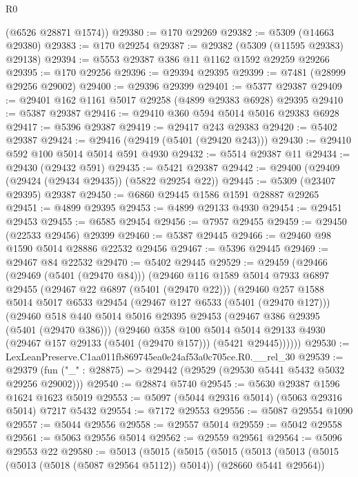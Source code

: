 \begin{lexlean}{R0}
\begin{coremodule}
      (@6526 @28871 @1574))
@29380 := @170 @29269
@29382 := @5309 (@14663 @29380)
@29383 := @170 @29254
@29387 := @29382 (@5309 (@11595 @29383) @29138)
@29394 := @5553 @29387 @386 @11 @1162 @1592 @29259 @29266
@29395 := @170 @29256
@29396 := @29394 @29395
@29399 := @7481 (@28999 @29256 @29002)
@29400 := @29396 @29399
@29401 := @5377 @29387
@29409 := @29401 @162 @1161 @5017 @29258 (@4899 @29383 @6928) @29395
@29410 := @5387 @29387
@29416 := @29410 @360 @594 @5014 @5016 @29383 @6928
@29417 := @5396 @29387
@29419 := @29417 @243 @29383
@29420 := @5402 @29387
@29424 := @29416 (@29419 (@5401 (@29420 @243)))
@29430 := @29410 @592 @100 @5014 @5014 @591 @4930
@29432 := @5514 @29387 @11
@29434 := @29430 (@29432 @591)
@29435 := @5421 @29387
@29442 := @29400 (@29409 (@29424 (@29434 @29435)) (@5822 @29254 @22))
@29445 := @5309 (@23407 @29395) @29387
@29450 := @6860 @29445 @1586 @1591 @28887 @29265
@29451 := @4899 @29395
@29453 := @4899 @29133 @4930
@29454 := @29451 @29453
@29455 := @6585 @29454
@29456 := @7957 @29455
@29459 := @29450 (@22533 @29456) @29399
@29460 := @5387 @29445
@29466 := @29460 @98 @1590 @5014 @28886 @22532 @29456
@29467 := @5396 @29445
@29469 := @29467 @84 @22532
@29470 := @5402 @29445
@29529 := @29459
    (@29466
      (@29469 (@5401 (@29470 @84)))
      (@29460
        @116
        @1589
        @5014
        @7933
        @6897
        @29455
        (@29467 @22 @6897 (@5401 (@29470 @22)))
        (@29460
          @257
          @1588
          @5014
          @5017
          @6533
          @29454
          (@29467 @127 @6533 (@5401 (@29470 @127)))
          (@29460
            @518
            @440
            @5014
            @5016
            @29395
            @29453
            (@29467 @386 @29395 (@5401 (@29470 @386)))
            (@29460
              @358
              @100
              @5014
              @5014
              @29133
              @4930
              (@29467 @157 @29133 (@5401 (@29470 @157)))
              (@5421 @29445))))))
@29530 := LexLeanPreserve.C1aa011fb869745ea0e24af53a0c705ce.R0.__rel_30
@29539 := @29379 (fun ("_" : @28875) => @29442 (@29529 (@29530 @5441 @5432 @5032 @29256 @29002)))
@29540 := @28874 @5740
@29545 := @5630 @29387 @1596 @1624 @1623 @5019
@29553 := @5097 (@5044 @29316 @5014) (@5063 @29316 @5014) @7217 @5432
@29554 := @7172 @29553
@29556 := @5087 @29554 @1090
@29557 := @5044 @29556
@29558 := @29557 @5014
@29559 := @5042 @29558
@29561 := @5063 @29556 @5014
@29562 := @29559 @29561
@29564 := @5096 @29553 @22
@29580 := @5013
    (@5015
      (@5015
        (@5015
          (@5013
            (@5013 (@5015 (@5013 (@5018 (@5087 @29564 @5112)) @5014)) (@28660 @5441 @29564))

\end{coremodule}
\end{lexlean}
